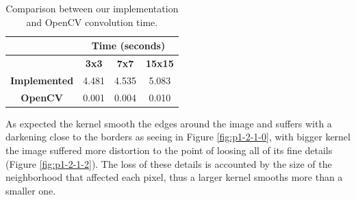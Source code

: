 \documentclass[12pt,a4paper]{article}
\begin{document}
\begin{table}[!h]
	\centering
	\begin{tabular}{|c|c|c|c|}
		\hline
		& \multicolumn{3}{c|}{\textbf{Time (seconds)}} \\ \hline
		\backslashbox{\textbf{Convolution}}{\textbf{Kernel Size}}    & \textbf{3x3}         & \textbf{7x7}          & \textbf{15x15}      \\ \hline
		\textbf{Implemented}  & 4.481      & 4.535      & 5.083     \\ \hline
		\textbf{OpenCV} & 0.001      & 0.004       & 0.010     \\ \hline
	\end{tabular}
	\caption{Comparison between our implementation and OpenCV convolution time.}
	\label{table:convolution-opencv}
\end{table}

As expected the kernel smooth the edges around the image and suffers with a darkening close to the borders as seeing in Figure \ref{fig:p1-2-1-0}, with bigger kernel the image suffered more distortion to the point of loosing all of its fine details (Figure \ref{fig:p1-2-1-2}). The loss of these details is accounted by the size of the neighborhood that affected each pixel, thus a larger kernel smooths more than a smaller one. \\
\end{document}
